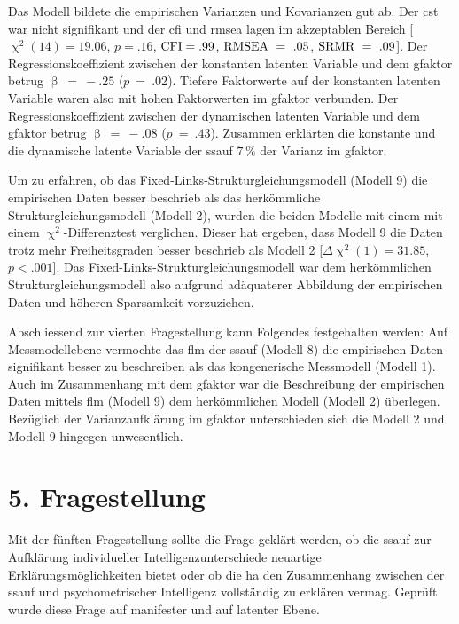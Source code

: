 \documentclass[11pt, twoside, a4paper]{book}		%
\begin{document}
Das Modell bildete die empirischen Varianzen und Kovarianzen gut ab. Der \gls{cst} war nicht signifikant und der \gls{cfi} und \gls{rmsea} lagen im akzeptablen Bereich [$\upchi^2(14)=19.06$, $p=.16$, $\textnormal{CFI}=.99$, $\textnormal{RMSEA}~=~.05$, $\textnormal{SRMR}~=~.09$]. 
Der Regressionskoeffizient zwischen der konstanten latenten Variable und dem \gls{gfaktor} betrug $\upbeta~=~-.25$ ($p~=~.02$). Tiefere Faktorwerte auf der konstanten latenten Variable waren also mit hohen Faktorwerten im \gls{gfaktor} verbunden. Der Regressionskoeffizient zwischen der dynamischen latenten Variable und dem \gls{gfaktor} betrug $\upbeta~=~-.08$ ($p~=~.43$).
Zusammen erklärten die konstante und die dynamische latente Variable der \gls{ssauf} $7\,\%$ der Varianz im \gls{gfaktor}.

Um zu erfahren, ob das Fixed-Links-Strukturgleichungsmodell (Modell 9) die empirischen Daten besser beschrieb als das herkömmliche Strukturgleichungsmodell (Modell 2), wurden die beiden Modelle mit einem mit einem $\upchi^2$-Differenztest \citep{Satorra2001} verglichen. Dieser hat ergeben, dass Modell 9 die Daten trotz mehr Freiheitsgraden besser beschrieb als Modell 2 [$\Delta\upchi^2(1)=31.85$, $p<.001$]. Das Fixed-Links-Strukturgleichungsmodell war dem herkömmlichen Strukturgleichungsmodell also aufgrund adäquaterer Abbildung der empirischen Daten und höheren Sparsamkeit vorzuziehen.

Abschliessend zur vierten Fragestellung kann Folgendes festgehalten werden: Auf Messmodellebene vermochte das \gls{flm} der \gls{ssauf} (Modell 8) die empirischen Daten signifikant besser zu beschreiben als das kongenerische Messmodell (Modell 1). Auch im Zusammenhang mit dem \gls{gfaktor} war die Beschreibung der empirischen Daten mittels \gls{flm} (Modell 9) dem herkömmlichen Modell (Modell 2) überlegen. Bezüglich der Varianzaufklärung im \gls{gfaktor} unterschieden sich die Modell 2 und Modell 9 hingegen unwesentlich. 










\section{5. Fragestellung}

Mit der fünften Fragestellung sollte die Frage geklärt werden, ob die \gls{ssauf} zur Aufklärung individueller Intelligenzunterschiede neuartige Erklärungsmöglichkeiten bietet oder ob die \gls{ha} den Zusammenhang zwischen der \gls{ssauf} und psychometrischer Intelligenz vollständig zu erklären vermag. Geprüft wurde diese Frage auf manifester und auf latenter Ebene.
\end{document}
